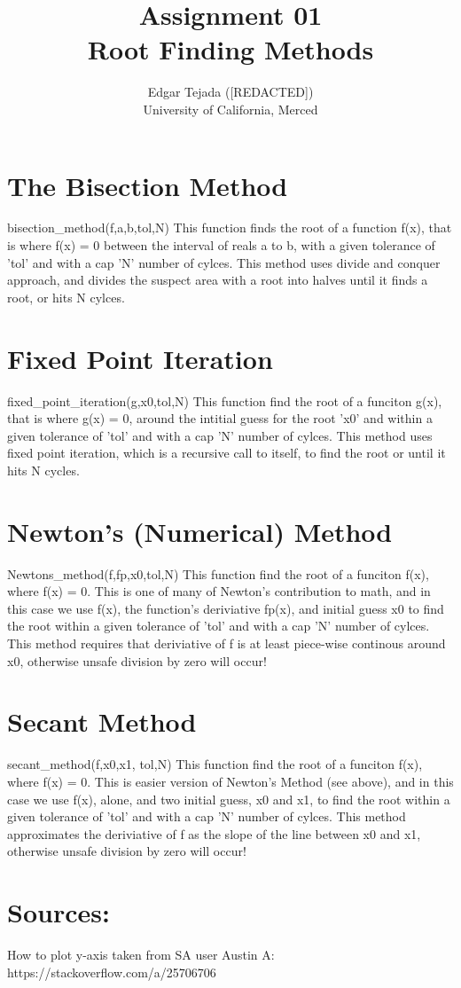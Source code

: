 \documentclass [12pt]{article}
\title{Assignment 01 \\\medskip Root Finding Methods}
\author{Edgar Tejada ([REDACTED])\\University of California, Merced}
\begin{document}
\maketitle

\newpage
\section{The Bisection Method}
\indent bisection_method(f,a,b,tol,N)
\indent \indent This function finds the root of a function f(x), that is where f(x) = 0 between the interval of reals a to b, with a given tolerance of 'tol' and with a cap 'N' number of cylces. This method uses divide and conquer approach, and divides the suspect area with a root into halves until it finds a root, or hits N cylces.

\newpage
\section{Fixed Point Iteration}

\indent fixed_point_iteration(g,x0,tol,N)
\indent \indent This function find the root of a funciton g(x), that is where g(x) = 0, around the intitial guess for the root 'x0' and within a given tolerance of 'tol' and with a cap 'N' number of cylces. This method uses fixed point iteration, which is a recursive call to itself, to find the root or until it hits N cycles.

\newpage
\section{Newton's (Numerical) Method}
\indent Newtons_method(f,fp,x0,tol,N)
\indent \indent This function find the root of a funciton f(x), where f(x) = 0. This is one of many of Newton's contribution to math, and in this case we use f(x), the function's deriviative fp(x), and initial guess x0 to find the root within a given tolerance of 'tol' and with a cap 'N' number of cylces. This method requires that deriviative of f is at least piece-wise continous around x0, otherwise unsafe division by zero will occur!

\newpage
\section{Secant Method}
\indent secant_method(f,x0,x1, tol,N)
\indent \indent This function find the root of a funciton f(x), where f(x) = 0. This is easier version of Newton's Method (see above), and in this case we use f(x), alone, and two initial guess, x0 and x1, to find the root within a given tolerance of 'tol' and with a cap 'N' number of cylces. This method approximates the deriviative of f as the slope of the line between x0 and x1, otherwise unsafe division by zero will occur!

\newpage
\section{Sources:}
How to plot y-axis taken from SA user Austin A:
\indent https://stackoverflow.com/a/25706706 


\nocite{*} 
\printbibliography
\end{document}

